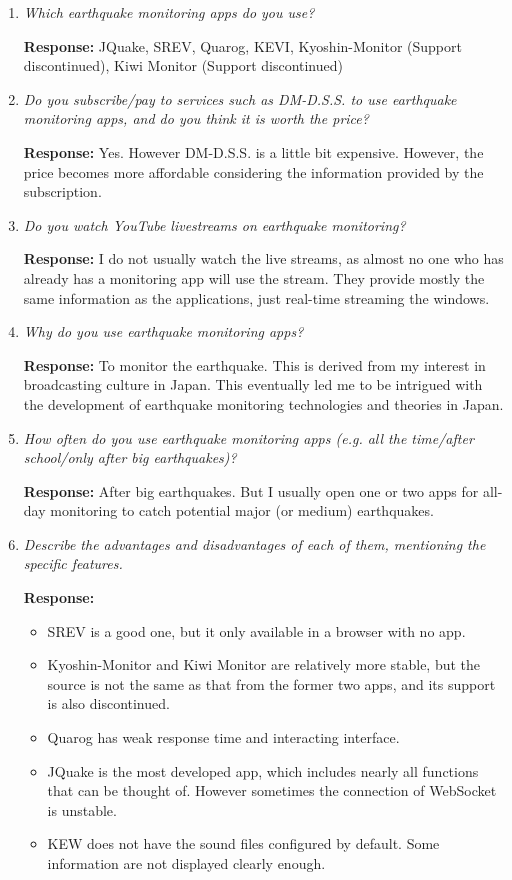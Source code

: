 \documentclass[10pt]{article}
\begin{document}
\begin{enumerate}
    \item \textit{Which earthquake monitoring apps do you use?}

          \textbf{Response:} JQuake, SREV, Quarog, KEVI, Kyoshin-Monitor (Support discontinued), Kiwi Monitor (Support discontinued)

    \item \textit{Do you subscribe/pay to services such as DM-D.S.S. to use earthquake monitoring apps, and do you think it is worth the price?}

          \textbf{Response:} Yes. However DM-D.S.S. is a little bit expensive. However, the price becomes more affordable considering the information provided by the subscription.

    \item \textit{Do you watch YouTube livestreams on earthquake monitoring?}

          \textbf{Response:} I do not usually watch the live streams, as almost no one who has already has a monitoring app will use the stream. They provide mostly the same information as the applications, just real-time streaming the windows.

    \item \textit{Why do you use earthquake monitoring apps?}

          \textbf{Response:} To monitor the earthquake. This is derived from my interest in broadcasting culture in Japan. This eventually led me to be intrigued with the development of earthquake monitoring technologies and theories in Japan.

    \item \textit{How often do you use earthquake monitoring apps (e.g. all the time/after school/only after big earthquakes)?}

          \textbf{Response:} After big earthquakes. But I usually open one or two apps for all-day monitoring to catch potential major (or medium) earthquakes.

    \item \textit{Describe the advantages and disadvantages of each of them, mentioning the specific features.}

          \textbf{Response:}
          \begin{itemize}
              \item SREV is a good one, but it only available in a browser with no app.
              \item Kyoshin-Monitor and Kiwi Monitor are relatively more stable, but the source is not the same as that from the former two apps, and its support is also discontinued.
              \item Quarog has weak response time and interacting interface.
              \item JQuake is the most developed app, which includes nearly all functions that can be thought of. However sometimes the connection of WebSocket is unstable.
              \item KEW does not have the sound files configured by default. Some information are not displayed clearly enough.
          \end{itemize}


\end{enumerate}
\end{document}
